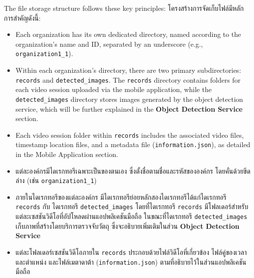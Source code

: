 \ifenglish
The file storage structure follows these key principles:
\else
โครงสร้างการจัดเก็บไฟล์มีหลักการสำคัญดังนี้:
\fi
\ifenglish
\begin{itemize}
    \item Each organization has its own dedicated directory, named according to the organization's name and ID, separated by an underscore (e.g., \texttt{organization1\_1}).
    \item Within each organization's directory, there are two primary subdirectories: \texttt{records} and \texttt{detected\_images}. The \texttt{records} directory contains folders for each video session uploaded via the mobile application, while the \texttt{detected\_images} directory stores images generated by the object detection service, which will be further explained in the \textbf{Object Detection Service} section.
    \item Each video session folder within \texttt{records} includes the associated video files, timestamp location files, and a metadata file (\texttt{information.json}), as detailed in the Mobile Application section.
\end{itemize}
\else
\begin{itemize}
    \item แต่ละองค์กรมีไดเรกทอรีเฉพาะเป็นของตนเอง ซึ่งตั้งชื่อตามชื่อและรหัสขององค์กร โดยคั่นด้วยขีดล่าง (เช่น \texttt{organization1\_1})
    \item ภายในไดเรกทอรีของแต่ละองค์กร มีไดเรกทอรีย่อยหลักสองไดเรกทอรีได้แก่ไดเรกทอรี \texttt{records} กับ ไดเรกทอรี \texttt{detected\_images} โดยที่ไดเรกทอรี \texttt{records} มีโฟลเดอร์สำหรับแต่ละเซสชันวิดีโอที่อัปโหลดผ่านแอปพลิเคชันมือถือ ในขณะที่ไดเรกทอรี \texttt{detected\_images} เก็บภาพที่สร้างโดยบริการตรวจจับวัตถุ ซึ่งจะอธิบายเพิ่มเติมในส่วน \textbf{Object Detection Service}
    \item แต่ละโฟลเดอร์เซสชันวิดีโอภายใน \texttt{records} ประกอบด้วยไฟล์วิดีโอที่เกี่ยวข้อง ไฟล์คู่ของเวลาและตำแหน่ง และไฟล์เมตาดาต้า (\texttt{information.json}) ตามที่อธิบายไว้ในส่วนแอปพลิเคชันมือถือ
\end{itemize}
\fi
